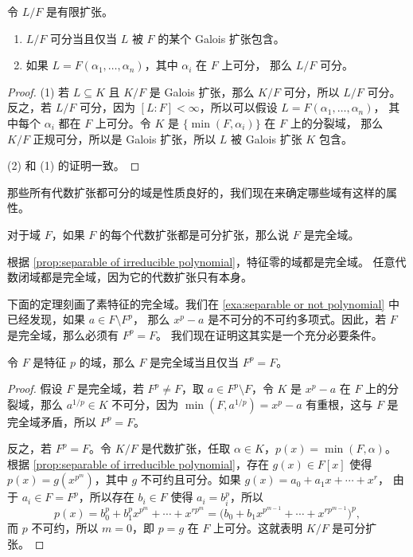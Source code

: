 \begin{corollary}\label{coro:generators are separable}
  令 $L/F$ 是有限扩张。
  \begin{enumerate}
    \item $L/F$ 可分当且仅当 $L$ 被 $F$ 的某个 Galois 扩张包含。
    \item 如果 $L=F(\alpha_1,\dots,\alpha_n)$，其中 $\alpha_i$ 在 $F$ 上可分，
    那么 $L/F$ 可分。
  \end{enumerate}
\end{corollary}
\begin{proof}
  (1) 若 $L\subseteq K$ 且 $K/F$ 是 Galois 扩张，那么 $K/F$ 可分，所以 $L/F$ 可分。
  反之，若 $L/F$ 可分，因为 $[L:F]<\infty$，所以可以假设 $L=F(\alpha_1,\dots,\alpha_n)$，
  其中每个 $\alpha_i$ 都在 $F$ 上可分。令 $K$ 是 $\{\min(F,\alpha_i)\}$ 在 $F$ 上的分裂域，
  那么 $K/F$ 正规可分，所以是 Galois 扩张，所以 $L$ 被 Galois 扩张 $K$ 包含。

  (2) 和 (1) 的证明一致。
\end{proof}

那些所有代数扩张都可分的域是性质良好的，我们现在来确定哪些域有这样的属性。

\begin{definition}
  对于域 $F$，如果 $F$ 的每个代数扩张都是可分扩张，那么说 $F$ 是完全域。
\end{definition}

\begin{example}
  根据 \autoref{prop:separable of irreducible polynomial}，特征零的域都是完全域。
  任意代数闭域都是完全域，因为它的代数扩张只有本身。
\end{example}

下面的定理刻画了素特征的完全域。我们在 \autoref{exa:separable or not polynomial} 中已经发现，如果 $a\in F\setminus F^p$，
那么 $x^p-a$ 是不可分的不可约多项式。因此，若 $F$ 是完全域，那么必须有 $F^p=F$。
我们现在证明这其实是一个充分必要条件。

\begin{theorem}
  令 $F$ 是特征 $p$ 的域，那么 $F$ 是完全域当且仅当 $F^p=F$。
\end{theorem}
\begin{proof}
  假设 $F$ 是完全域，若 $F^p\neq F$，取 $a\in F^p\setminus F$，令 $K$
  是 $x^p-a$ 在 $F$ 上的分裂域，那么 $a^{1/p}\in K$ 不可分，因为 $\min(F,a^{1/p})=x^p-a$
  有重根，这与 $F$ 是完全域矛盾，所以 $F^p=F$。

  反之，若 $F^p=F$。令 $K/F$ 是代数扩张，任取 $\alpha\in K$，$p(x)=\min(F,\alpha)$。
  根据 \autoref{prop:separable of irreducible polynomial}，存在 $g(x)\in F[x]$
  使得 $p(x)=g(x^{p^m})$，其中 $g$ 不可约且可分。如果 $g(x)=a_0+a_1x+\cdots+x^r$，
  由于 $a_i\in F=F^p$，所以存在 $b_i\in F$ 使得 $a_i=b_i^p$，所以
  \[
    p(x)=b_0^p+b_1^px^{p^m}+\cdots+x^{rp^{m}}=\bigl(b_0+b_1x^{p^{m-1}}+\cdots+x^{rp^{m-1}}\bigr)^p,
  \]
  而 $p$ 不可约，所以 $m=0$，即 $p=g$ 在 $F$ 上可分。这就表明 $K/F$ 是可分扩张。
\end{proof}

